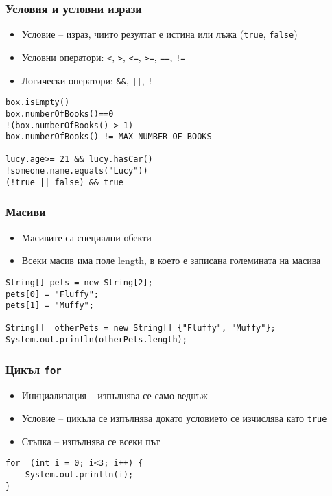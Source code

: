 \documentclass[ignorenonframetext, hyperref=unicode,unicode]{beamer}
\begin{document}
\begin{frame}[containsverbatim]\frametitle{Условия и условни изрази}
\begin{itemize}
 \item Условие – израз, чиито резултат е истина или лъжа (\lstinline{true}, \lstinline{false})
\item Условни оператори: \lstinline{<}, \lstinline{>}, \lstinline{<=}, \lstinline{>=}, \lstinline{==}, \lstinline{!=}
\item Логически оператори: \lstinline{&&}, \lstinline{||}, \lstinline{!}
\end{itemize}
\begin{lstlisting}
box.isEmpty()
box.numberOfBooks()==0
!(box.numberOfBooks() > 1)
box.numberOfBooks() != MAX_NUMBER_OF_BOOKS 

lucy.age>= 21 && lucy.hasCar()
!someone.name.equals("Lucy"))
(!true || false) && true
\end{lstlisting}
\end{frame}

\begin{frame}[containsverbatim]\frametitle{Масиви}
\begin{itemize}
 \item Масивите са специални обекти
 \item Всеки масив има поле length, в което е записана големината на масива
\end{itemize}
\begin{lstlisting}
String[] pets = new String[2]; 
pets[0] = "Fluffy"; 
pets[1] = "Muffy"; 
		
String[]  otherPets = new String[] {"Fluffy", "Muffy"}; 
System.out.println(otherPets.length);
\end{lstlisting}
\end{frame}


\begin{frame}[containsverbatim]\frametitle{Цикъл \lstinline{for}}
\begin{itemize}
 \item Инициализация -- изпълнява се само веднъж
 \item Условие -- цикъла се изпълнява докато условието се изчислява като \lstinline{true}
 \item Стъпка -- изпълнява се всеки път
\end{itemize}
\begin{lstlisting}
for  (int i = 0; i<3; i++) {
	System.out.println(i);
}
\end{lstlisting}
\end{frame}
\end{document}
